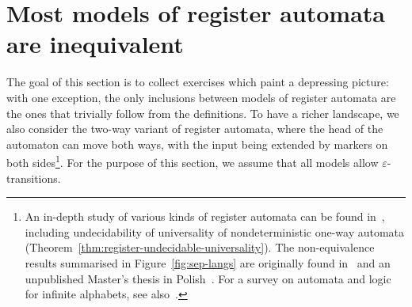 \section{Most models of register automata are inequivalent}
The goal of this section is to collect exercises which paint a depressing picture: with one exception, the only inclusions between models of register automata are the ones that trivially follow from the definitions. To have a richer landscape, we also consider the 
two-way variant of register automata, where the head of the automaton can move both ways, with the input being extended by markers on both sides\footnote{An in-depth study of various kinds of register automata can be found in~\cite{DBLP:journals/tocl/NevenSV04}, including undecidability of universality of nondeterministic one-way automata (Theorem~\ref{thm:register-undecidable-universality}).
The non-equivalence results summarised in Figure~\ref{fig:sep-langs} are originally found in~\cite{DBLP:journals/tcs/KaminskiF94,DBLP:journals/tocl/NevenSV04} and an unpublished Master's thesis in Polish~\cite{wysocki}. For a survey on automata and logic for infinite alphabets, see also~\cite{DBLP:conf/csl/Segoufin06}.}. For the purpose of this section, we assume that all models allow $\varepsilon$-transitions.


